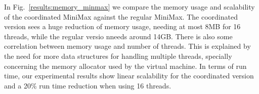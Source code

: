 In Fig.~\ref{results:memory_minmax} we compare the memory usage and scalability
of the coordinated MiniMax against the regular MiniMax. The coordinated version
sees a huge reduction of memory usage, needing at most 8MB for 16 threads, while
the regular versio nneeds around 14GB. There is also some
correlation between memory usage and number of threads. This is explained by the
need for more data structures for handling multiple threads, specially
concerning the memory allocator used by the virtual machine. In terms of run
time, our experimental results show linear scalability for the coordinated
version and a 20\% run time reduction when using 16 threads.
